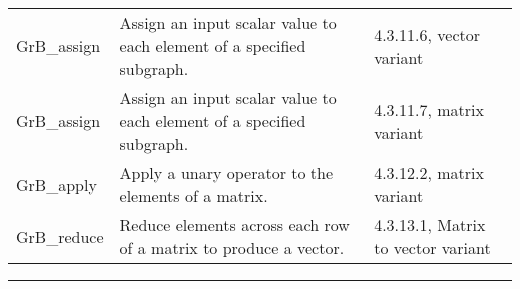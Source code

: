 \begin{table*}[h]
\begin{center}
\begin{tabular}{lll}
GrB\_assign                  & Assign an input scalar value to each element of a specified subgraph.               & 4.3.11.6, vector variant \\
GrB\_assign                  & Assign an input scalar value to each element of a specified subgraph.              &  4.3.11.7, matrix variant \\
GrB\_apply                   & Apply a unary operator to the elements of a matrix.                                            & 4.3.12.2, matrix variant \\
GrB\_reduce                  & Reduce elements across each row of a matrix to produce a vector.                  & 4.3.13.1, Matrix to vector variant \\
\end{tabular}
\end{center}
\hrule
\end{table*}

